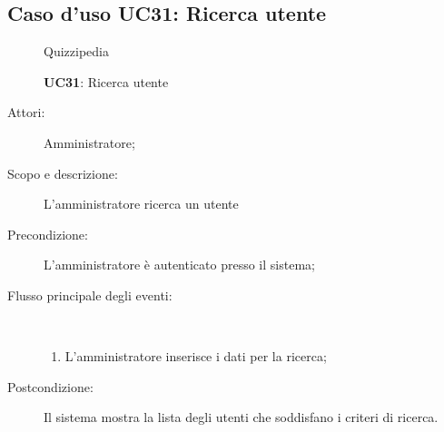 \subsection{Caso d'uso UC31: Ricerca utente}
	\begin{figure}[H]
		\centering
		\begin{resizedtikzpicture}{\textwidth}
		\begin{umlsystem}[x=0, fill=lightgray!20]{Quizzipedia}
		\end{umlsystem}
		\end{resizedtikzpicture}
		\caption{\textbf{UC31}: Ricerca utente}
		\label{UC31}
	\end{figure}
\begin{description}
\item[Attori:] Amministratore;
\item[Scopo e descrizione:] L'amministratore ricerca un utente
      \item[Precondizione:] L'amministratore è autenticato presso il sistema;

        \item[Flusso principale degli eventi:] \ 
 \begin{enumerate}
          \item L'amministratore inserisce i dati per la ricerca;

      \end{enumerate}
    \item[Postcondizione:] Il sistema mostra la lista degli utenti che soddisfano i criteri di ricerca.
  \end{description}
\hypertarget{UC32}{}

